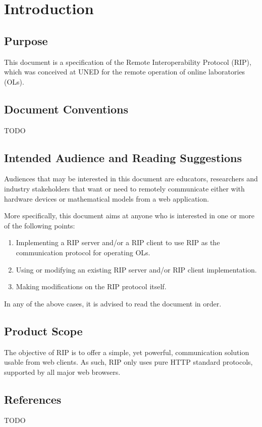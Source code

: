 \chapter{Introduction}
\label{Introduction}

\section{Purpose}
This document is a specification of the Remote Interoperability Protocol (RIP), which was conceived at UNED for the remote operation of online laboratories (OLs).

\section{Document Conventions}
TODO

\section{Intended Audience and Reading Suggestions}
Audiences that may be interested in this document are educators, researchers and industry stakeholders that want or need to remotely communicate either with hardware devices or mathematical models from a web application. 

More specifically, this document aims at anyone who is interested in one or more of the following points:

\begin{enumerate}
    \item Implementing a RIP server and/or a RIP client to use RIP as the communication protocol for operating OLs.
    \item Using or modifying an existing RIP server and/or RIP client implementation.
    \item Making modifications on the RIP protocol itself.
\end{enumerate}

In any of the above cases, it is advised to read the document in order.

\section{Product Scope}
The objective of RIP is to offer a simple, yet powerful, communication solution usable from web clients. As such, RIP only uses pure HTTP standard protocols, supported by all major web browsers.

\section{References}
TODO


